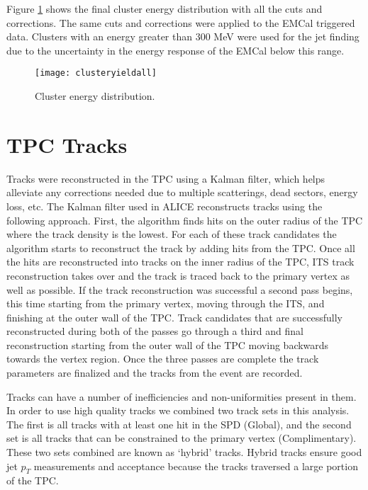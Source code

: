 Figure \ref{fig:EMCalfinal} shows the final cluster energy distribution with all the cuts and corrections.  The same cuts and corrections were applied to the EMCal triggered data.  Clusters with an energy greater than 300 MeV were used for the jet finding due to the uncertainty in the energy response of the EMCal below this range.

\begin{figure}[h]
\texttt{[image: clusteryieldall]}
\centering
\caption{Cluster energy distribution.}
\label{fig:EMCalfinal}
\end{figure}
\newpage

\section{TPC Tracks}

Tracks were reconstructed in the TPC using a Kalman filter, which helps alleviate any corrections needed due to multiple scatterings, dead sectors, energy loss, etc.  The Kalman filter used in ALICE reconstructs tracks using the following approach.  First, the algorithm finds hits on the outer radius of the TPC where the track density is the lowest.  For each of these track candidates the algorithm starts to reconstruct the track by adding hits from the TPC.   Once all the hits are reconstructed into tracks on the inner radius of the TPC, ITS track reconstruction takes over and the track is traced back to the primary vertex as well as possible.  If the track reconstruction was successful a second pass begins, this time starting from the primary vertex, moving through the ITS, and finishing at the outer wall of the TPC.  Track candidates that are successfully reconstructed during both of the passes go through a third and final reconstruction starting from the outer wall of the TPC moving backwards towards the vertex region.  Once the three passes are complete the track parameters are finalized and the tracks from the event are recorded. 

Tracks can have a number of inefficiencies and non-uniformities present in them.  In order to use high quality tracks we combined two track sets in this analysis.  The first is all tracks with at least one hit in the SPD (Global), and the second set is all tracks that can be constrained to the primary vertex (Complimentary).  These two sets combined are known as `hybrid' tracks.  Hybrid tracks ensure good jet $p_{T}$ measurements and acceptance because the tracks traversed a large portion of the TPC.  

